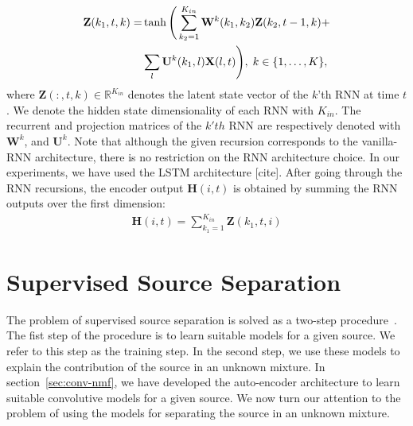 \documentclass{article}
\begin{document}
\begin{align}
  \mathbf Z(k_1, t, k) =& \tanh \Bigg( \sum_{k_2 = 1}^{K_{in}} \mathbf W^k(k_1,k_2 ) \mathbf Z(k_2, t-1, k) + \notag \\
  & \hspace{0cm} \sum_l \mathbf U^k(k_1,l) \mathbf X(l, t) \Bigg),\; k \in \{1,\dots,K\}, 
\end{align}
where $\mathbf Z(:, t, k) \in \mathbb R^{K_{in}}$ denotes the latent state vector of the $k$'th RNN at time $t$. We denote the hidden state dimensionality of each RNN with $K_{in}$. The recurrent and projection matrices of the $k'th$ RNN are respectively denoted with $\mathbf W^k$, and $\mathbf U^k$. Note that although the given recursion corresponds to the vanilla-RNN architecture, there is no restriction on the RNN architecture choice. In our experiments, we have used the LSTM architecture [cite]. After going through the RNN recursions, the encoder output $\mathbf H(i, t)$ is obtained by summing the RNN outputs over the first dimension:
\begin{align}
  \mathbf H(i, t) = \sum_{k_1=1}^{K_{in}} \mathbf Z(k_1, t, i)
\end{align}






\section{Supervised Source Separation}
\label{sec:ss}
The problem of supervised source separation is solved as a two-step procedure~\cite{smaragdis2007supervised}. The fist step of the procedure is to learn suitable models for a given source. We refer to this step as the training step. In the second step, we use these models to explain the contribution of the source in an unknown mixture. In section~\ref{sec:conv-nmf}, we have developed the auto-encoder architecture to learn suitable convolutive models for a given source. We now turn our attention to the problem of using the models for separating the source in an unknown mixture.
\end{document}
